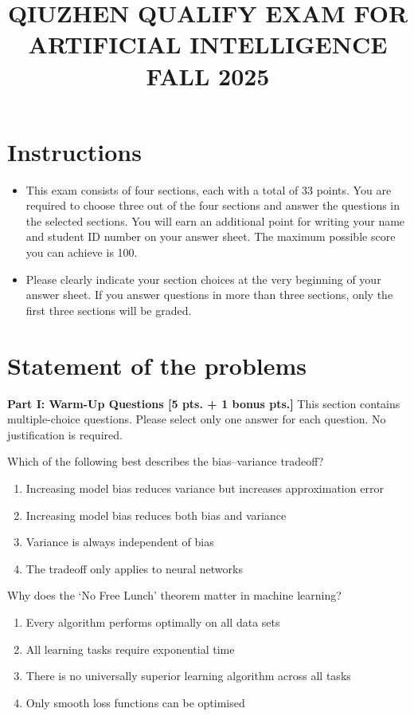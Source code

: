 \documentclass[11pt,a4paper]{article}
\title{\textbf{QIUZHEN QUALIFY EXAM FOR ARTIFICIAL INTELLIGENCE}\\[0.5em]\Large FALL 2025}
\date{}
\author{}
\newcommand{\examstatement}[1]{%
  \par\addvspace{0.85em}%
  \noindent{\bfseries #1}\par\nobreak\addvspace{0.28em}%
}
\begin{document}
\maketitle
\vspace{-3em}

\tableofcontents

\section{Instructions}
\begin{itemize}
    \item This exam consists of four sections, each with a total of 33 points. You are required to choose three out of the four sections and answer the questions in the selected sections. You will earn an additional point for writing your name and student ID number on your answer sheet. The maximum possible score you can achieve is 100.
    \item Please clearly indicate your section choices at the very beginning of your answer sheet. If you answer questions in more than three sections, only the first three sections will be graded.
\end{itemize}

\section{Statement of the problems}

\par

\noindent\textbf{Part I: Warm-Up Questions [5 pts. + 1 bonus pts.]}
This section contains multiple-choice questions. Please select only one answer for each question. No justification is required.

\examstatement{Problem 1. [0.5 pts.]}
Which of the following best describes the bias--variance tradeoff?
\begin{enumerate}[label=(\alph*)]
    \item Increasing model bias reduces variance but increases approximation error
    \item Increasing model bias reduces both bias and variance
    \item Variance is always independent of bias
    \item The tradeoff only applies to neural networks
\end{enumerate}

\examstatement{Problem 2. [0.5 pts.]}
Why does the `No Free Lunch' theorem matter in machine learning?
\begin{enumerate}[label=(\alph*)]
    \item Every algorithm performs optimally on all data sets
    \item All learning tasks require exponential time
    \item There is no universally superior learning algorithm across all tasks
    \item Only smooth loss functions can be optimised
\end{enumerate}
\end{document}
